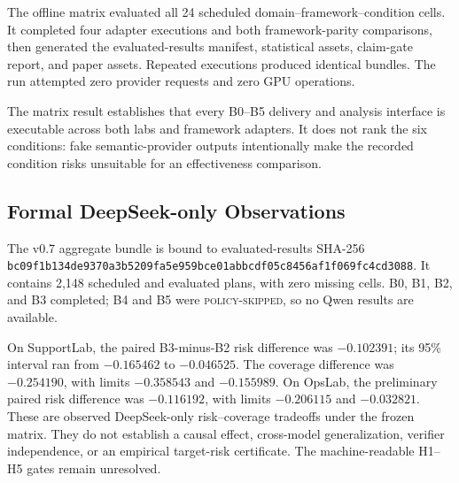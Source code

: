 The offline matrix evaluated all 24 scheduled domain--framework--condition
cells. It completed four adapter executions and both framework-parity
comparisons, then generated the evaluated-results manifest, statistical assets,
claim-gate report, and paper assets. Repeated executions produced identical
bundles. The run attempted zero provider requests and zero GPU operations.

The matrix result establishes that every B0--B5 delivery and analysis interface
is executable across both labs and framework adapters. It does not rank the six
conditions: fake semantic-provider outputs intentionally make the recorded
condition risks unsuitable for an effectiveness comparison.

\subsection{Formal DeepSeek-only Observations}

The v0.7 aggregate bundle is bound to evaluated-results SHA-256
\nolinkurl{bc09f1b134de9370a3b5209fa5e959bce01abbcdf05c8456af1f069fc4cd3088}.
It contains 2,148 scheduled and evaluated plans, with zero missing cells. B0,
B1, B2, and B3 completed; B4 and B5 were \textsc{policy-skipped}, so no Qwen
results are available.

On SupportLab, the paired B3-minus-B2 risk difference was $-0.102391$; its 95\%
interval ran from $-0.165462$ to $-0.046525$. The coverage difference was
$-0.254190$, with limits $-0.358543$ and $-0.155989$. On OpsLab, the preliminary
paired risk difference was $-0.116192$, with limits $-0.206115$ and $-0.032821$.
These are observed DeepSeek-only risk--coverage
tradeoffs under the frozen matrix. They do not establish a causal effect,
cross-model generalization, verifier independence, or an empirical target-risk
certificate. The machine-readable H1--H5 gates remain unresolved.
